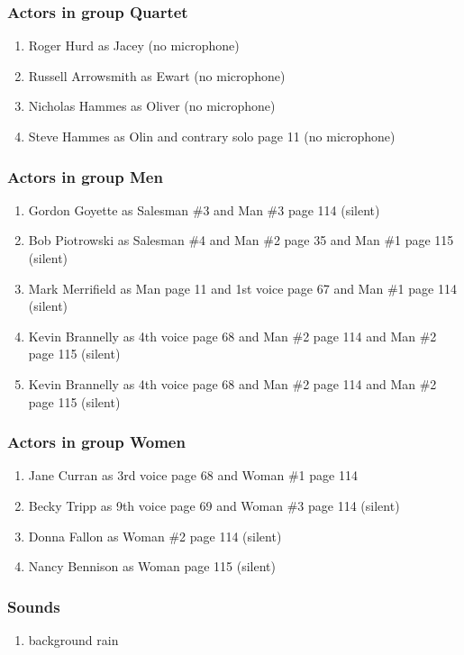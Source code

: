 \subsubsection{Actors in group Quartet}
\begin{enumerate}
\item Roger Hurd as Jacey (no microphone)
\item Russell Arrowsmith as Ewart (no microphone)
\item Nicholas Hammes as Oliver (no microphone)
\item Steve Hammes as Olin and contrary solo page 11 (no microphone)
\end{enumerate}
\subsubsection{Actors in group Men}
\begin{enumerate}
\item Gordon Goyette as Salesman \#3 and Man \#3 page 114 (silent)
\item Bob Piotrowski as Salesman \#4 and Man \#2 page 35 and Man \#1 page 115 (silent)
\item Mark Merrifield as Man page 11 and 1st voice page 67 and Man \#1 page 114 (silent)
\item Kevin Brannelly as 4th voice page 68 and Man \#2 page 114 and Man \#2 page 115 (silent)
\item Kevin Brannelly as 4th voice page 68 and Man \#2 page 114 and Man \#2 page 115 (silent)
\end{enumerate}
\subsubsection{Actors in group Women}
\begin{enumerate}
\item Jane Curran as 3rd voice page 68 and Woman \#1 page 114
\item Becky Tripp as 9th voice page 69 and Woman \#3 page 114 (silent)
\item Donna Fallon as Woman \#2 page 114 (silent)
\item Nancy Bennison as Woman page 115 (silent)
\end{enumerate}

\subsubsection{Sounds}
\begin{enumerate}
\item background rain
\end{enumerate}
